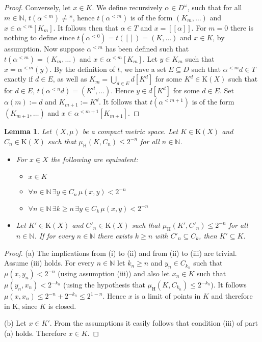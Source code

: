 \documentclass[microtype]{jloganal}
\theoremstyle{plain}
\newtheorem{lemma}[theorem]{Lemma}
\theoremstyle{definition}
\newcommand{\NN}{\mathbb{N}}
\newcommand{\compact}{\mathrm{K}}
\newcommand{\hdm}{\mu_{\mathrm H}}
\newcommand{\val}[1]{[\![#1]\!]}
\begin{document}
\begin{proof}
Conversely, let $x\in K$. We define recursively $\alpha\in D^\omega$,
such that for all $m\in\NN$, $t(\alpha^{<m})\neq\ast$, hence
$t(\alpha^{<m})$ is of the form $(K_m,\ldots)$ and $x\in\alpha^{<m}[K_m]$.
It follows then that $\alpha\in T$ and $x=\val{\alpha}$.
For $m=0$ there is nothing to define since 
$t(\alpha^{<0}) = t([]) = (K,\ldots)$ and $x\in K$, by assumption.
Now suppose $\alpha^{<m}$ has been defined such that 
$t(\alpha^{<m}) = (K_m,\ldots)$ and $x\in\alpha^{<m}[K_m]$.
Let $y\in K_m$ such that $x = \alpha^{<m}(y)$. By the definition of $t$,
we have a set $E\subseteq D$ such that $\alpha^{<m}d\in T$ exactly if $d\in E$, 
as well as $K_m = \bigcup_{d\in E} d[K^d]$ for some 
$K^d\in\compact(X)$ such that for $d\in E$, $t(\alpha^{<n}d)=(K^d,\ldots)$. 
Hence $y\in d[K^d]$ for some $d\in E$. 
Set $\alpha(m) := d$ and $K_{m+1} := K^d$. It follows that 
$t(\alpha^{<m+1})$ is of the form $(K_{m+1},\ldots)$ and 
$x\in \alpha^{<m+1}[K_{m+1}]$.
\end{proof}
\begin{lemma}
\label{lem-xink}
Let $(X,\mu)$ be a compact metric space.
Let $K\in\compact(X)$ and $C_n\in\compact(X)$
such that $\hdm(K,C_n)\le 2^{-n}$ for all $n\in\NN$.
\begin{itemize}
\item[(a)] For $x\in X$ the following are equivalent:
\begin{itemize}
\item[(i)] $x\in K$
\item[(ii)] $\forall n\in \NN\,\exists y\in C_n\,\mu(x,y)< 2^{-n}$
\item[(iii)] $\forall n\in \NN\,\exists k\ge n\,\exists y\in C_k\,
               \mu(x,y)< 2^{-n}$
\end{itemize}
\item[(b)] Let $K'\in\compact(X)$ and $C'_n\in\compact(X)$
such that $\hdm(K',C'_n)\le 2^{-n}$ for all $n\in\NN$.
If for every $n\in\NN$ there exists $k\ge n$ with $C'_n\subseteq C_k$,
then $K' \subseteq K$.
\end{itemize}
\end{lemma}
\begin{proof}
(a) The implications from (i) to (ii) and from (ii) to (iii) are trivial.
Assume (iii) holds. For every $n\in\NN$ let $k_n\ge n$ and $y_n\in C_{k_n}$
such that $\mu(x,y_n)<2^{-n}$ (using assumption (iii)) and also let
$x_n\in K$ such that $\mu(y_n,x_n) < 2^{-k_n}$ (using the hypothesis that
$\hdm(K,C_{k_n})\le 2^{-k_n}$).
It follows $\mu(x,x_n) \le 2^{-n} + 2^{-k_n} \le 2^{1-n}$.
Hence $x$ is a limit of points in $K$ and therefore in K, since $K$ is closed.

(b) Let $x \in K'$. From the assumptions it easily follows that condition (iii)
of part (a) holds. Therefore $x\in K$.
\end{proof}
\end{document}
